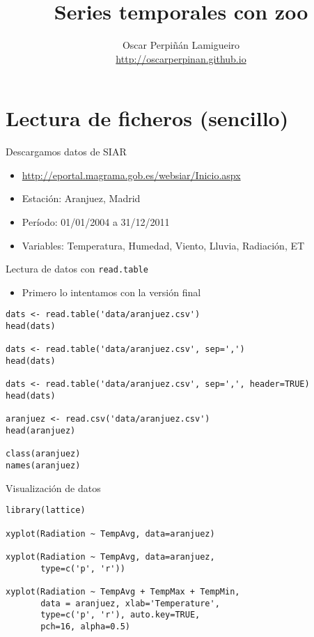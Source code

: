 \documentclass[xcolor={usenames,svgnames,dvipsnames}]{beamer}
\author{Oscar Perpiñán Lamigueiro \\ \url{http://oscarperpinan.github.io}}
\date{}
\title{Series temporales con zoo}
\begin{document}
\maketitle


\section{Lectura de ficheros (sencillo)}
\label{sec-1}
\begin{frame}[label=sec-1-1]{Descargamos datos de SIAR}
\begin{itemize}
\item \url{http://eportal.magrama.gob.es/websiar/Inicio.aspx}
\item \alert{Estación}: Aranjuez, Madrid
\item \alert{Período}: 01/01/2004 a 31/12/2011
\item \alert{Variables}: Temperatura, Humedad, Viento, Lluvia, Radiación, ET
\end{itemize}
\end{frame}
\begin{frame}[fragile,label=sec-1-2]{Lectura de datos con \texttt{read.table}}
 \begin{itemize}
\item Primero lo intentamos con la versión final
\end{itemize}
\lstset{language=R,numbers=none}
\begin{lstlisting}
dats <- read.table('data/aranjuez.csv')
head(dats)

dats <- read.table('data/aranjuez.csv', sep=',')
head(dats)

dats <- read.table('data/aranjuez.csv', sep=',', header=TRUE)
head(dats)

aranjuez <- read.csv('data/aranjuez.csv')
head(aranjuez)

class(aranjuez)
names(aranjuez)
\end{lstlisting}
\end{frame}
\begin{frame}[fragile,label=sec-1-3]{Visualización de datos}
 \lstset{language=R,numbers=none}
\begin{lstlisting}
library(lattice)

xyplot(Radiation ~ TempAvg, data=aranjuez)

xyplot(Radiation ~ TempAvg, data=aranjuez,
       type=c('p', 'r'))

xyplot(Radiation ~ TempAvg + TempMax + TempMin,
       data = aranjuez, xlab='Temperature',
       type=c('p', 'r'), auto.key=TRUE,
       pch=16, alpha=0.5)
\end{lstlisting}
\end{frame}
\end{document}
